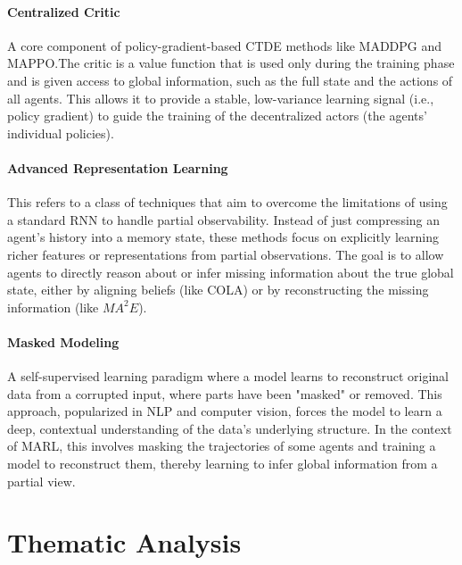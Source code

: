 \paragraph{Centralized Critic}
A core component of policy-gradient-based CTDE methods like MADDPG and MAPPO.The critic is a value function that is used only during the training phase and is given access to global information, such as the full state and the actions of all agents. This allows it to provide a stable, low-variance learning signal (i.e., policy gradient) to guide the training of the decentralized actors (the agents' individual policies).

\paragraph{Advanced Representation Learning}
This refers to a class of techniques that aim to overcome the limitations of using a standard RNN to handle partial observability. Instead of just compressing an agent's history into a memory state, these methods focus on explicitly learning richer features or representations from partial observations. The goal is to allow agents to directly reason about or infer missing information about the true global state, either by aligning beliefs (like COLA) or by reconstructing the missing information (like ${MA}^2E$).

\paragraph{Masked Modeling}
A self-supervised learning paradigm where a model learns to reconstruct original data from a corrupted input, where parts have been "masked" or removed. This approach, popularized in NLP and computer vision, forces the model to learn a deep, contextual understanding of the data's underlying structure. In the context of MARL, this involves masking the trajectories of some agents and training a model to reconstruct them, thereby learning to infer global information from a partial view.
\section{Thematic Analysis}

